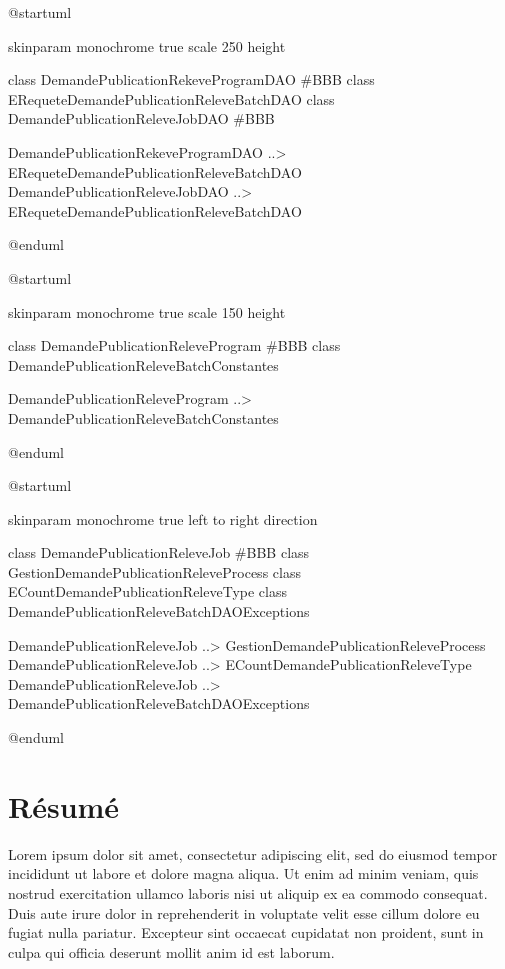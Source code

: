 \documentclass[a4paper, 12pt]{report}
\begin{document}
\begin{center}
  \begin{plantuml}
    @startuml

    skinparam monochrome true
    scale 250 height

    class DemandePublicationRekeveProgramDAO #BBB
    class ERequeteDemandePublicationReleveBatchDAO
    class DemandePublicationReleveJobDAO #BBB

    DemandePublicationRekeveProgramDAO ..> ERequeteDemandePublicationReleveBatchDAO
    DemandePublicationReleveJobDAO ..> ERequeteDemandePublicationReleveBatchDAO

    @enduml
  \end{plantuml}

  \vspace{0.5cm}

  \begin{plantuml}
    @startuml

    skinparam monochrome true
    scale 150 height

    class DemandePublicationReleveProgram #BBB
    class DemandePublicationReleveBatchConstantes

    DemandePublicationReleveProgram ..> DemandePublicationReleveBatchConstantes

    @enduml
  \end{plantuml}

  \vspace{1cm}

  \begin{plantuml}
    @startuml

    skinparam monochrome true
    left to right direction

    class DemandePublicationReleveJob #BBB
    class GestionDemandePublicationReleveProcess
    class ECountDemandePublicationReleveType
    class DemandePublicationReleveBatchDAOExceptions

    DemandePublicationReleveJob ..> GestionDemandePublicationReleveProcess
    DemandePublicationReleveJob ..> ECountDemandePublicationReleveType
    DemandePublicationReleveJob ..> DemandePublicationReleveBatchDAOExceptions

    @enduml
  \end{plantuml}
\end{center}

\clearpage
\pagestyle{empty}
{
  \renewcommand{\thispagestyle}[1]{}
  \tableofcontents
}

\chapter*{Résumé}
\thispagestyle{empty}

Lorem ipsum dolor sit amet, consectetur adipiscing elit, sed do eiusmod tempor incididunt ut labore et dolore magna aliqua. Ut enim ad minim veniam, quis nostrud exercitation ullamco laboris nisi ut aliquip ex ea commodo consequat. Duis aute irure dolor in reprehenderit in voluptate velit esse cillum dolore eu fugiat nulla pariatur. Excepteur sint occaecat cupidatat non proident, sunt in culpa qui officia deserunt mollit anim id est laborum. 
\end{document}
